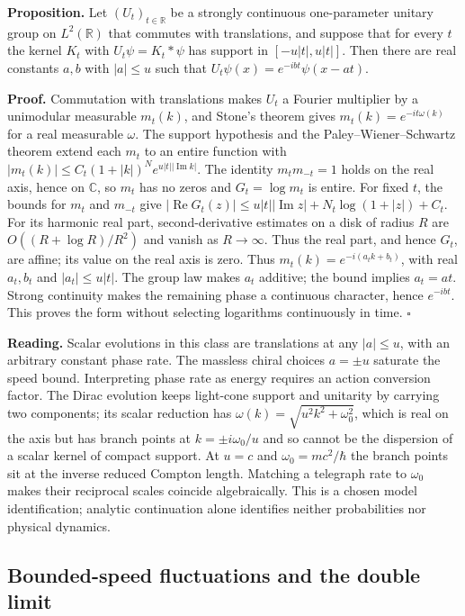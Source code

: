 \documentclass[11pt,a4paper]{article}
\begin{document}
\textbf{Proposition.} Let \((U_t)_{t\in\mathbb R}\) be a strongly
continuous one-parameter unitary group on \(L^2(\mathbb R)\) that
commutes with translations, and suppose that for every \(t\) the kernel
\(K_t\) with \(U_t\psi=K_t*\psi\) has support in \([-u|t|,u|t|]\). Then
there are real constants \(a,b\) with \(|a|\le u\) such that
\(U_t\psi(x)=e^{-ibt}\psi(x-at)\).

\textbf{Proof.} Commutation with translations makes \(U_t\) a Fourier
multiplier by a unimodular measurable \(m_t(k)\), and Stone's theorem
gives \(m_t(k)=e^{-it\omega(k)}\) for a real measurable \(\omega\). The
support hypothesis and the Paley--Wiener--Schwartz theorem extend each
\(m_t\) to an entire function with
\(|m_t(k)|\le C_t(1+|k|)^{N}e^{u|t||\operatorname{Im}k|}\). The identity
\(m_tm_{-t}=1\) holds on the real axis, hence on \(\mathbb C\), so
\(m_t\) has no zeros and \(G_t=\log m_t\) is entire. For fixed \(t\),
the bounds for \(m_t\) and \(m_{-t}\) give
\(|\operatorname{Re}G_t(z)|\le u|t||\operatorname{Im}z|+N_t\log(1+|z|)+C_t\).
For its harmonic real part, second-derivative estimates on a disk of
radius \(R\) are \(O((R+\log R)/R^2)\) and vanish as \(R\to\infty\).
Thus the real part, and hence \(G_t\), are affine; its value on the real
axis is zero. Thus \(m_t(k)=e^{-i(a_tk+b_t)}\), with real \(a_t,b_t\)
and \(|a_t|\le u|t|\). The group law makes \(a_t\) additive; the bound
implies \(a_t=at\). Strong continuity makes the remaining phase a
continuous character, hence \(e^{-ibt}\). This proves the form without
selecting logarithms continuously in time. \(\square\)

\textbf{Reading.} Scalar evolutions in this class are translations at
any \(|a|\le u\), with an arbitrary constant phase rate. The massless
chiral choices \(a=\pm u\) saturate the speed bound. Interpreting phase
rate as energy requires an action conversion factor. The Dirac evolution
keeps light-cone support and unitarity by carrying two components; its
scalar reduction has \(\omega(k)=\sqrt{u^2k^2+\omega_0^2}\), which is
real on the axis but has branch points at \(k=\pm i\omega_0/u\) and so
cannot be the dispersion of a scalar kernel of compact support. At
\(u=c\) and \(\omega_0=mc^2/\hbar\) the branch points sit at the inverse
reduced Compton length. Matching a telegraph rate to \(\omega_0\) makes
their reciprocal scales coincide algebraically. This is a chosen model
identification; analytic continuation alone identifies neither
probabilities nor physical dynamics.

\hypertarget{bounded-speed-fluctuations-and-the-double-limit}{%
\subsection{Bounded-speed fluctuations and the double
limit}\label{bounded-speed-fluctuations-and-the-double-limit}}
\end{document}
